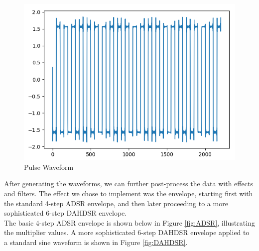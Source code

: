 \documentclass[a0,portrait]{a0poster}
\begin{document}
\begin{sectbox}
\begin{figure}[H]
\begin{minipage}[b]{0.45\textwidth}
    \label{fig:sawtoothWaveform}
  \end{minipage}
  \hfill
  \begin{minipage}[b]{0.45\textwidth}
    \includegraphics[width=\textwidth]{pulse.png}
    \caption{Pulse Waveform}
    \label{fig:pulseWaveform}
  \end{minipage}
\end{figure}

\vspace{1cm}


After generating the waveforms, we can further post-process the data with effects and filters. The effect we chose to implement was the envelope, starting first with the standard 4-step ADSR envelope, and then later proceeding to a more sophisticated 6-step DAHDSR envelope.\\
The basic 4-step ADSR envelope is shown below in Figure \ref{fig:ADSR}, illustrating the multiplier values. A more sophisticated 6-step DAHDSR envelope applied to a standard sine waveform is shown in Figure \ref{fig:DAHDSR}.\\


\end{sectbox}
\end{document}
